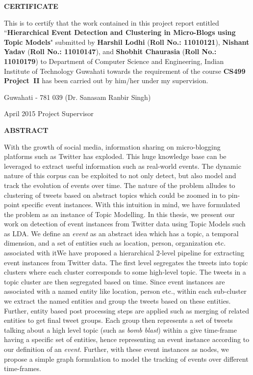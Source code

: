 \documentclass[12pt,a4paper]{report}
\theoremstyle{plain}
\theoremstyle{definition}
\theoremstyle{remark}
\begin{document}
 \setcounter{page}{2}
\begin{center}
{\Large{\bf{CERTIFICATE}}}
\end{center}


\noindent
This is to certify that the work contained in this project report
entitled ``{\bf Hierarchical Event Detection and Clustering in Micro-Blogs using Topic Models}" submitted
by {\bf Harshil Lodhi} ({\bf Roll No.: 11010121}), {\bf Nishant Yadav} ({\bf Roll No.: 11010147}), and {\bf Shobhit Chaurasia} ({\bf Roll No.: 11010179}) to Department of Computer Science and Engineering, Indian Institute of Technology Guwahati
towards the requirement of the course \textbf{CS499 Project~II}
has been carried out by him/her under my
supervision.

\vspace{4cm}

\noindent Guwahati - 781 039 \hfill (Dr. Sanasam Ranbir Singh)

\noindent April 2015 \hfill Project Supervisor

\clearpage

\begin{center}
{\Large{\bf{ABSTRACT}}}
\end{center}
With the growth of social media, information sharing on micro-blogging platforms such as Twitter has exploded. This huge knowledge base can be leveraged to extract useful information such as real-world events. The dynamic nature of this corpus can be exploited to not only detect, but also model and track the evolution of events over time. The nature of the problem alludes to clustering of tweets based on abstract topics which could be zoomed in to pin-point specific event instances. With this intuition in mind, we have formulated the problem as an instance of Topic Modelling. In this thesis, we present our work on detection of event instances from Twitter data using Topic Models such as LDA. We define an \emph{event} as an abstract idea which has a topic, a temporal dimension, and a set of entities such as location, person, organization etc. associated with itWe have proposed a hierarchical 2-level pipeline for extracting event instances from Twitter data. The first level segregates the tweets into topic clusters where each cluster corresponds to some high-level topic. The tweets in a topic cluster are then segregated based on time. Since event instances are associated with a named entity like location, person etc., within each sub-cluster we extract the named entities and group the tweets based on these entities. Further, entity based post processing steps are applied such as merging of related entities to get final tweet groups. Each group then represents a set of tweets talking about a high level topic (such as \textit{bomb blast}) within a give time-frame having a specific set of entities, hence representing an event instance according to our definition of an \textit{event}. Further, with these event instances as nodes, we propose a simple graph formulation to model the tracking of events over different time-frames.
\end{document}
